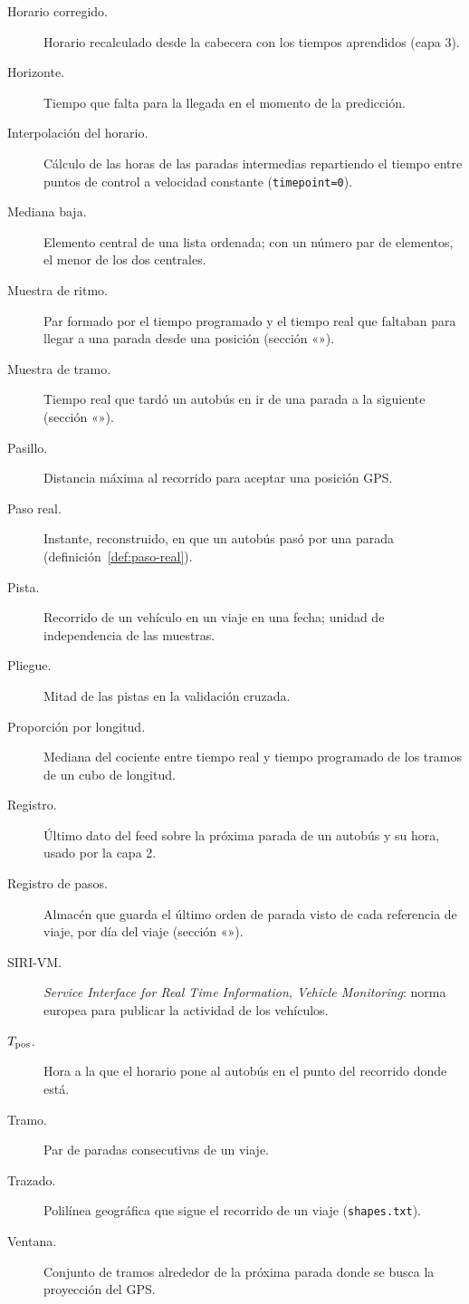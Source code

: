 \begin{description}
  \item[Horario corregido.] Horario recalculado desde la cabecera con los tiempos aprendidos (capa 3).
  \item[Horizonte.] Tiempo que falta para la llegada en el momento de la predicción.
  \item[Interpolación del horario.] Cálculo de las horas de las paradas intermedias repartiendo el tiempo entre puntos
        de control a velocidad constante (\texttt{timepoint=0}).
  \item[Mediana baja.] Elemento central de una lista ordenada; con un número par de elementos, el menor de los dos
        centrales.
  \item[Muestra de ritmo.] Par formado por el tiempo programado y el tiempo real que faltaban para llegar a una parada
        desde una posición (sección «»).
  \item[Muestra de tramo.] Tiempo real que tardó un autobús en ir de una parada a la siguiente
        (sección «»).
  \item[Pasillo.] Distancia máxima al recorrido para aceptar una posición GPS.
  \item[Paso real.] Instante, reconstruido, en que un autobús pasó por una parada (definición~\ref{def:paso-real}).
  \item[Pista.] Recorrido de un vehículo en un viaje en una fecha; unidad de independencia de las muestras.
  \item[Pliegue.] Mitad de las pistas en la validación cruzada.
  \item[Proporción por longitud.] Mediana del cociente entre tiempo real y tiempo programado de los tramos de un cubo de
        longitud.
  \item[Registro.] Último dato del feed sobre la próxima parada de un autobús y su hora, usado por la capa 2.
  \item[Registro de pasos.] Almacén que guarda el último orden de parada visto de cada referencia de viaje, por día del viaje
        (sección «»).
  \item[SIRI-VM.] \emph{Service Interface for Real Time Information, Vehicle Monitoring}: norma europea para publicar la
        actividad de los vehículos.
  \item[$T_{\mathrm{pos}}$.] Hora a la que el horario pone al autobús en el punto del recorrido donde está.
  \item[Tramo.] Par de paradas consecutivas de un viaje.
  \item[Trazado.] Polilínea geográfica que sigue el recorrido de un viaje (\texttt{shapes.txt}).
  \item[Ventana.] Conjunto de tramos alrededor de la próxima parada donde se busca la proyección del GPS.
\end{description}

